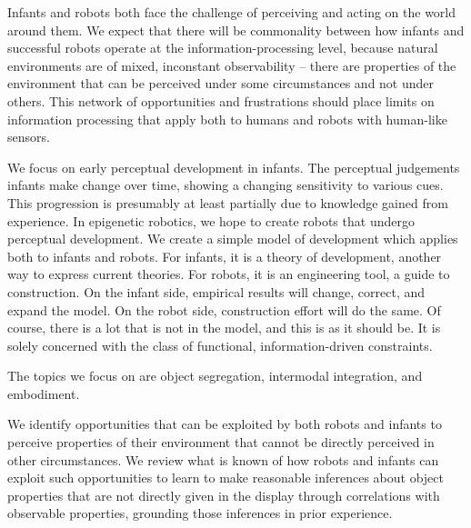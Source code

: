 
Infants and robots both face the challenge of perceiving and acting on
the world around them.  
%
%
%
We expect
that there will be commonality between how infants and successful
robots operate at the information-processing level, because natural
environments are of mixed, inconstant observability -- there are
properties of the environment that can be perceived under some
circumstances and not under others.  This network of opportunities and
frustrations should place limits on information processing that apply
both to humans and robots with human-like sensors.

We focus on early perceptual development in infants.  The
perceptual judgements infants make change over time, showing
a changing sensitivity to various cues. This progression
is presumably at least partially due to knowledge gained
from experience.  In epigenetic robotics, we hope to 
create robots that undergo perceptual development.
%
We create a simple model of development which applies both to infants
and robots.  
%
For infants, it is a theory of development, another way to
express current theories.
%
For robots, it is an engineering tool, a guide to
construction.
%
On the infant side, empirical results will change, correct, and expand
the model.  On the robot side, construction effort will do the same.
%
%
Of course, there is a lot that is not in the model, and this is
as it should be.  It is solely concerned with the class of 
functional, information-driven constraints.

The topics we focus on are object segregation,
intermodal integration, and embodiment.


We identify opportunities that can be exploited by both robots and
infants to perceive properties of their environment that cannot be
directly perceived in other circumstances.  We review what is known of
how robots and infants can exploit such opportunities to learn to make
reasonable inferences 
%
%
about object properties that are not directly given in the display
%
through correlations
with observable properties, grounding those inferences in prior
experience.




